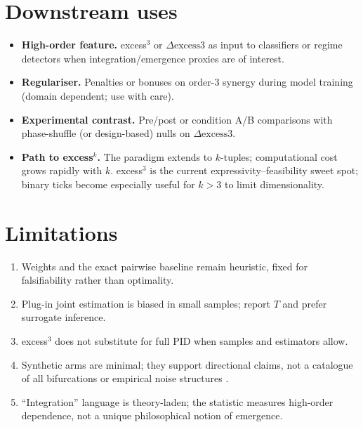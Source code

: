 \documentclass[11pt,a4paper]{article}
\begin{document}
\section{Downstream uses}
\label{sec:downstream}

\begin{itemize}[leftmargin=*,itemsep=3pt]
  \item \textbf{High-order feature.}
  excess$^3$ or $\Delta\mathrm{excess3}$ as input to classifiers or regime
  detectors when integration/emergence proxies are of interest.
  \item \textbf{Regulariser.}
  Penalties or bonuses on order-3 synergy during model training (domain
  dependent; use with care).
  \item \textbf{Experimental contrast.}
  Pre/post or condition A/B comparisons with phase-shuffle (or design-based)
  nulls on $\Delta\mathrm{excess3}$.
  \item \textbf{Path to excess$^k$.}
  The paradigm extends to $k$-tuples; computational cost grows rapidly with
  $k$. excess$^3$ is the current expressivity--feasibility sweet spot; binary
  ticks become especially useful for $k>3$ to limit dimensionality.
\end{itemize}

\section{Limitations}
\label{sec:limitations}

\begin{enumerate}[leftmargin=*,itemsep=3pt]
  \item Weights and the exact pairwise baseline remain heuristic, fixed for
  falsifiability rather than optimality.
  \item Plug-in joint estimation is biased in small samples; report $T$ and
  prefer surrogate inference.
  \item excess$^3$ does not substitute for full PID when samples and
  estimators allow.
  \item Synthetic arms are minimal; they support directional claims, not a
  catalogue of all bifurcations or empirical noise structures
  \citep{Strogatz2001}.
  \item ``Integration'' language is theory-laden; the statistic measures
  high-order dependence, not a unique philosophical notion of emergence.
\end{enumerate}
\end{document}
